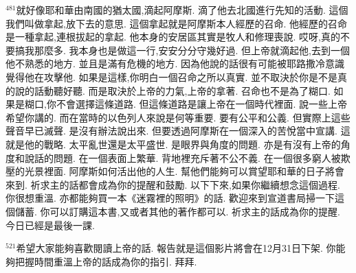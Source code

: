\documentclass{book}
\begin{document}
$^{481}$就好像耶和華由南國的猶太國,滴起阿摩斯.
滴了他去北國進行先知的活動.
這個我們叫做拿起,放下去的意思.
這個拿起就是阿摩斯本人經歷的召命.
他經歷的召命是一種拿起,連根拔起的拿起.
他本身的安居區其實是牧人和修理喪說.
哎呀,真的不要搞我那麼多.
我本身也是做這一行,安安分分守幾好過.
但上帝就滴起他,去到一個他不熟悉的地方.
並且是滿有危機的地方.
因為他說的話很有可能被耶路撒冷意識覺得他在攻擊他.
如果是這樣,你明白一個召命之所以真實.
並不取決於你是不是真的說的話動聽好聽.
而是取決於上帝的力氣,上帝的拿著.
召命也不是為了糊口.
如果是糊口,你不會選擇這條道路.
但這條道路是讓上帝在一個時代裡面.
說一些上帝希望你講的.
而在當時的以色列人來說是何等重要.
要有公平和公義.
但實際上這些聲音早已滅聲.
是沒有辦法說出來.
但要透過阿摩斯在一個深入的苦悅當中宣講.
這就是他的戰略.
太平亂世還是太平盛世.
是眼界與角度的問題.
亦是有沒有上帝的角度和說話的問題.
在一個表面上繁華.
背地裡充斥著不公不義.
在一個很多窮人被欺壓的光景裡面.
阿摩斯如何活出他的人生.
幫他們能夠可以賞望耶和華的日子將會來到.
祈求主的話都會成為你的提醒和鼓勵.
以下下來,如果你繼續想念這個過程.
你很想重溫.
亦都能夠買一本《迷霧裡的照明》的話.
歡迎來到宣道書局掃一下這個儲蓄.
你可以訂購這本書,又或者其他的著作都可以.
祈求主的話成為你的提醒.
今日已經是最後一課.

$^{521}$希望大家能夠喜歡閱讀上帝的話.
報告就是這個影片將會在12月31日下架.
你能夠把握時間重溫上帝的話成為你的指引.
拜拜.
\newpage

\allsectionsfont{\centering}

\setlength\parindent{0pt}
\setlength{\columnsep}{1.25em}
\setlength{\parfillskip}{0pt}
\setlength{\tabcolsep}{1em}
\raggedbottom



\newfontfamily{}
\newfontfamily{}
\newfontfamily{}
\newfontfamily{}
\newfontfamily{}
\newcommand{\chfont}[1]{\centerfont{\huge\textcolor{hcolor}{#1}}}
\newcommand{\leftcitation}[1]{\leftcitationfont{\Large\textcolor{hcolor}{#1}}}
\newcommand{\rightcitation}[1]{\rightcitationfont{\normalsize\textcolor{rcolor}{#1}}}
\newfontfamily{}
\end{document}

